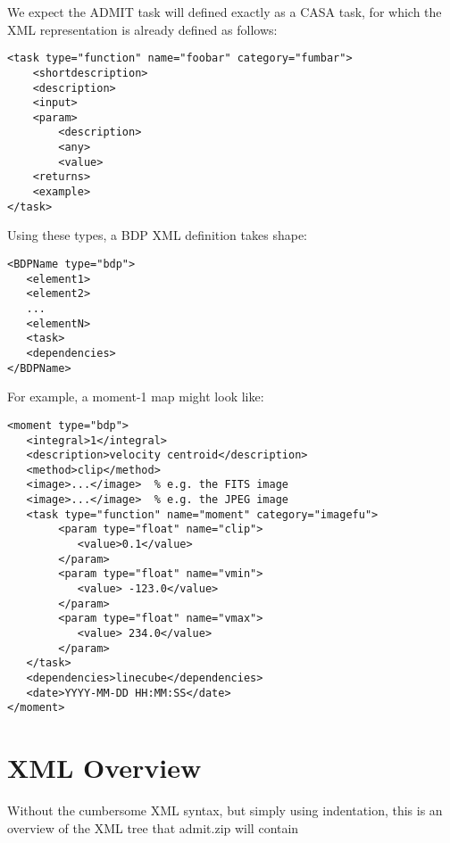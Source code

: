 \documentclass{article}
\begin{document}
We expect the ADMIT task will defined exactly as a CASA task, for which the XML
representation is already defined as follows:

\begin{verbatim}
<task type="function" name="foobar" category="fumbar">
    <shortdescription>
    <description>
    <input>
    <param>
        <description>
        <any>
        <value>
    <returns>
    <example>
</task>  

\end{verbatim}

Using these types, a BDP XML definition takes shape:

\begin{verbatim}
<BDPName type="bdp">
   <element1>
   <element2>
   ...
   <elementN>
   <task>
   <dependencies>
</BDPName>

\end{verbatim}

\noindent For example, a moment-1 map might look like:

\begin{verbatim}
<moment type="bdp">
   <integral>1</integral>
   <description>velocity centroid</description>
   <method>clip</method>
   <image>...</image>  % e.g. the FITS image
   <image>...</image>  % e.g. the JPEG image
   <task type="function" name="moment" category="imagefu">
        <param type="float" name="clip">
           <value>0.1</value>
        </param>
        <param type="float" name="vmin">
           <value> -123.0</value>
        </param>
        <param type="float" name="vmax">
           <value> 234.0</value>
        </param>
   </task>
   <dependencies>linecube</dependencies>
   <date>YYYY-MM-DD HH:MM:SS</date>
</moment>

\end{verbatim}
 

\section{XML Overview}
Without the cumbersome XML syntax, but simply using indentation, this is
an overview of the XML tree that admit.zip will contain

\newpage
\end{document}
